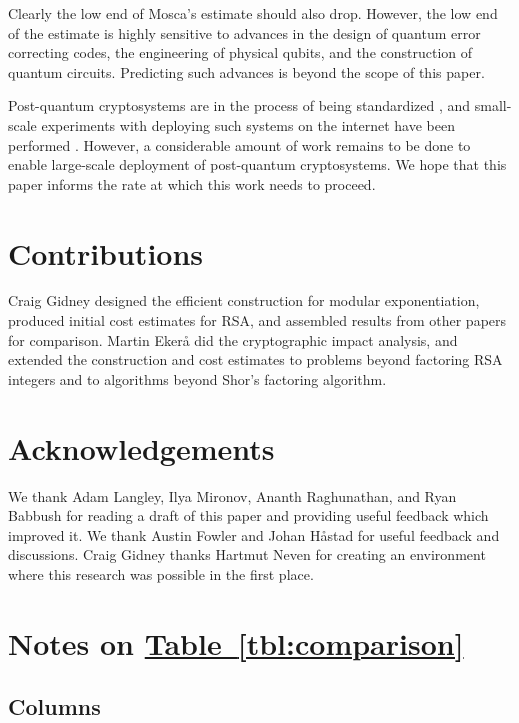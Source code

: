 \documentclass[superscriptaddress,notitlepage,longbibliography]{revtex4-1}
\theoremstyle{definition}
\theoremstyle{definition}
\newcommand{\tbl}[1]{\hyperref[tbl:#1]{Table~\ref*{tbl:#1}}}
\begin{document}
Clearly the low end of Mosca's estimate should also drop.
However, the low end of the estimate is highly sensitive to advances in the design of quantum error correcting codes, the engineering of physical qubits, and the construction of quantum circuits.
Predicting such advances is beyond the scope of this paper.

Post-quantum cryptosystems are in the process of being standardized \cite{alagic2019status}, and small-scale experiments with deploying such systems on the internet have been performed \cite{google2016postquantum}.
However, a considerable amount of work remains to be done to enable large-scale deployment of post-quantum cryptosystems.
We hope that this paper informs the rate at which this work needs to proceed.


\section{Contributions}
Craig Gidney designed the efficient construction for modular exponentiation, produced initial cost estimates for RSA, and assembled results from other papers for comparison.
Martin Ekerå did the cryptographic impact analysis, and extended the construction and cost estimates to problems beyond factoring RSA integers and to algorithms beyond Shor's factoring algorithm.

\section{Acknowledgements}
We thank Adam Langley, Ilya Mironov, Ananth Raghunathan, and Ryan Babbush for reading a draft of this paper and providing useful feedback which improved it.
We thank Austin Fowler and Johan Håstad for useful feedback and discussions.
Craig Gidney thanks Hartmut Neven for creating an environment where this research was possible in the first place.


\appendix

\section{Notes on \texorpdfstring{\tbl{comparison}}{Table I}}
\label{app:table-details}

\subsection{Columns}
\end{document}
